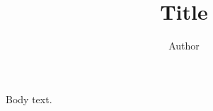 \documentclass[prl,byrevtex,twocolumn]{revtex4}
\begin{document}
\title{Title}
\author{Author}
\maketitle
Body text.
\end{document}
